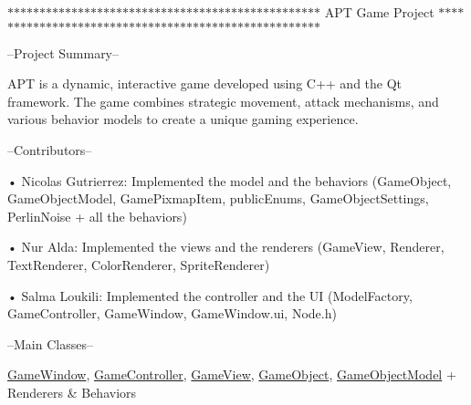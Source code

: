 \label{index_md_README}%
%
 $\ast$$\ast$$\ast$$\ast$$\ast$$\ast$$\ast$$\ast$$\ast$$\ast$$\ast$$\ast$$\ast$$\ast$$\ast$$\ast$$\ast$$\ast$$\ast$$\ast$$\ast$$\ast$$\ast$$\ast$$\ast$$\ast$$\ast$$\ast$$\ast$$\ast$$\ast$$\ast$$\ast$$\ast$$\ast$$\ast$$\ast$$\ast$$\ast$$\ast$$\ast$$\ast$$\ast$$\ast$$\ast$$\ast$$\ast$$\ast$$\ast$ APT Game Project $\ast$$\ast$$\ast$$\ast$$\ast$$\ast$$\ast$$\ast$$\ast$$\ast$$\ast$$\ast$$\ast$$\ast$$\ast$$\ast$$\ast$$\ast$$\ast$$\ast$$\ast$$\ast$$\ast$$\ast$$\ast$$\ast$$\ast$$\ast$$\ast$$\ast$$\ast$$\ast$$\ast$$\ast$$\ast$$\ast$$\ast$$\ast$$\ast$$\ast$$\ast$$\ast$$\ast$$\ast$$\ast$$\ast$$\ast$$\ast$$\ast$$\ast$$\ast$$\ast$$\ast$

--Project Summary--

APT is a dynamic, interactive game developed using C++ and the Qt framework. The game combines strategic movement, attack mechanisms, and various behavior models to create a unique gaming experience.

--Contributors-- \begin{DoxyVerb}• Nicolas Gutrierrez: Implemented the model and the behaviors (GameObject, GameObjectModel, GamePixmapItem, publicEnums, GameObjectSettings, PerlinNoise + all the behaviors)

• Nur Alda: Implemented the views and the renderers (GameView, Renderer, TextRenderer, ColorRenderer, SpriteRenderer)

• Salma Loukili: Implemented the controller and the UI (ModelFactory, GameController, GameWindow, GameWindow.ui, Node.h)
\end{DoxyVerb}


--Main Classes--

\mbox{\hyperlink{classGameWindow}{Game\+Window}}, \mbox{\hyperlink{classGameController}{Game\+Controller}}, \mbox{\hyperlink{classGameView}{Game\+View}}, \mbox{\hyperlink{classGameObject}{Game\+Object}}, \mbox{\hyperlink{classGameObjectModel}{Game\+Object\+Model}} + Renderers \& Behaviors

